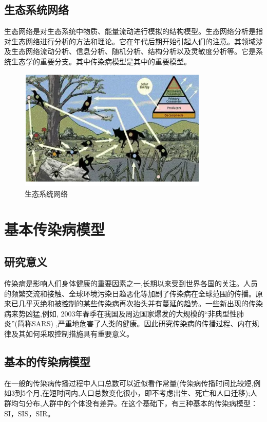\documentclass[12pt]{report}
\begin{document}
	
	\subsection{生态系统网络}
	生态网络是对生态系统中物质、能量流动进行模拟的结构模型。生态网络分析是指对生态网络进行分析的方法和理论。它在年代后期开始引起人们的注意。其领域涉及生态网络流动分析、信息分析、随机分析、结构分析以及灵敏度分析等。它是系统生态学的重要分支。其中传染病模型是其中的重要模型。
	\begin{figure}
		\centering
		\includegraphics[width=0.8\textwidth]{img/stnetwork.png}
		\caption{生态系统网络} 
		\label{img}
	\end{figure}
	\section{基本传染病模型}
	
	
	\subsection{研究意义}
	
	传染病是影响人们身体健康的重要因素之一,长期以来受到世界各国的关注。人员的频繁交流和接触、全球环境污染日趋恶化等加剧了传染病在全球范围的传播。原来已几乎灭绝和被控制的某些传染病再次抬头并有蔓延的趋势。一些新出现的传染病来势凶猛,例如, 2003年春季在我国及周边国家爆发的大规模的“非典型性肺炎”(简称SARS) ,严重地危害了人类的健康。因此研究传染病的传播过程、内在规律及其如何采取控制措施具有重要意义。
	
	\subsection{基本的传染病模型}
	
	在一般的传染病传播过程中人口总数可以近似看作常量(传染病传播时间比较短,例如3到5个月,在短时间内,人口总数变化很小，即不考虑出生、死亡和人口迁移);人群均匀分布,人群中的个体没有差异。在这个基础下，有三种基本的传染病模型：SI，SIS，SIR。
	
\end{document}
